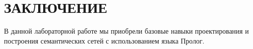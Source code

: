 \section*{ЗАКЛЮЧЕНИЕ}

В данной лабораторной работе мы приобрели базовые навыки проектирования
и построения семантических сетей с использованием языка Пролог.

\newpage